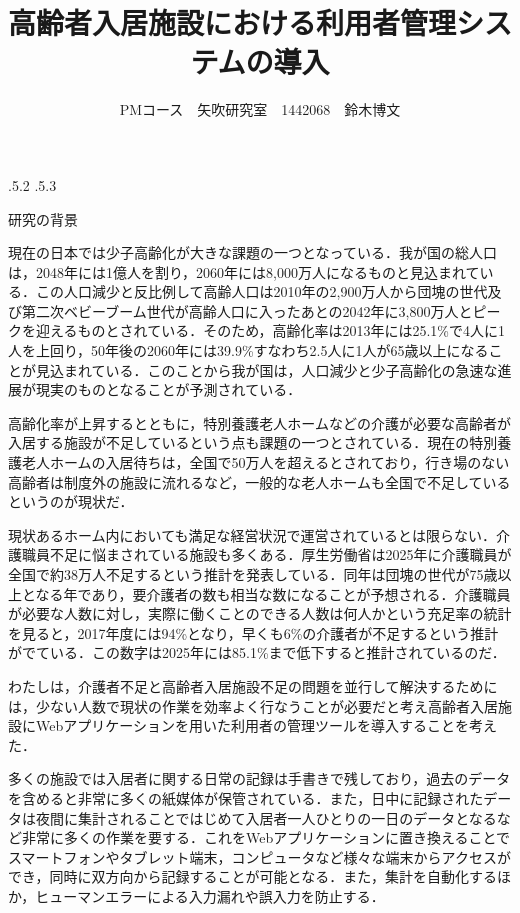 \documentclass[uplatex]{jsarticle}
\title{\vspace{-14mm}高齢者入居施設における利用者管理システムの導入}
\author{PMコース　矢吹研究室　1442068　鈴木博文}
\date{}%
\makeatletter
\renewcommand{\section}{%
    \if@slide\clearpage\fi
    \@startsection{section}{1}{\z@}%
    {\Cvs \@plus.5\Cdp \@minus.2\Cdp}%
    {.5\Cvs \@plus.3\Cdp}%
    {\normalfont\raggedright}}
\makeatother
\begin{document}
\maketitle

\section{研究の背景}

現在の日本では少子高齢化が大きな課題の一つとなっている．我が国の総人口は，2048年には1億人を割り，2060年には8,000万人になるものと見込まれている．この人口減少と反比例して高齢人口は2010年の2,900万人から団塊の世代及び第二次ベビーブーム世代が高齢人口に入ったあとの2042年に3,800万人とピークを迎えるものとされている．そのため，高齢化率は2013年には25.1\%で4人に1人を上回り，50年後の2060年には39.9\%すなわち2.5人に1人が65歳以上になることが見込まれている．このことから我が国は，人口減少と少子高齢化の急速な進展が現実のものとなることが予測されている\cite{site1}．

高齢化率が上昇するとともに，特別養護老人ホームなどの介護が必要な高齢者が入居する施設が不足しているという点も課題の一つとされている．現在の特別養護老人ホームの入居待ちは，全国で50万人を超えるとされており，行き場のない高齢者は制度外の施設に流れるなど，一般的な老人ホームも全国で不足しているというのが現状だ\cite{site2}．

現状あるホーム内においても満足な経営状況で運営されているとは限らない．介護職員不足に悩まされている施設も多くある．厚生労働省は2025年に介護職員が全国で約38万人不足するという推計を発表している．同年は団塊の世代が75歳以上となる年であり，要介護者の数も相当な数になることが予想される．介護職員が必要な人数に対し，実際に働くことのできる人数は何人かという充足率の統計を見ると，2017年度には94\%となり，早くも6\%の介護者が不足するという推計がでている．この数字は2025年には85.1\%まで低下すると推計されているのだ\cite{site3}．

わたしは，介護者不足と高齢者入居施設不足の問題を並行して解決するためには，少ない人数で現状の作業を効率よく行なうことが必要だと考え高齢者入居施設にWebアプリケーションを用いた利用者の管理ツールを導入することを考えた．

多くの施設では入居者に関する日常の記録は手書きで残しており，過去のデータを含めると非常に多くの紙媒体が保管されている．また，日中に記録されたデータは夜間に集計されることではじめて入居者一人ひとりの一日のデータとなるなど非常に多くの作業を要する．これをWebアプリケーションに置き換えることでスマートフォンやタブレット端末，コンピュータなど様々な端末からアクセスができ，同時に双方向から記録することが可能となる．また，集計を自動化するほか，ヒューマンエラーによる入力漏れや誤入力を防止する．
\end{document}
